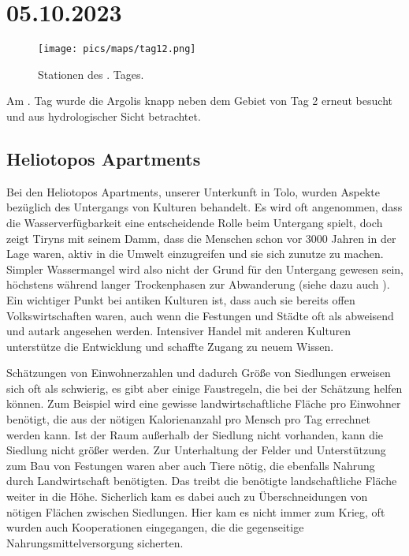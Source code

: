 \documentclass[preprint]{geomorphica} %
\begin{document}

\section{05.10.2023}

\begin{figure}[!h]
    \centering
    \texttt{[image: pics/maps/tag12.png]}
    \caption{Stationen des \theday. Tages.}
    \label{pic:tag12}
\end{figure}

Am \theday. Tag wurde die Argolis knapp neben dem Gebiet von Tag 2 erneut besucht und aus hydrologischer Sicht betrachtet.

\subsection{Heliotopos Apartments}

Bei den Heliotopos Apartments, unserer Unterkunft in Tolo, wurden Aspekte bezüglich des Untergangs von Kulturen behandelt. Es wird oft angenommen, dass die Wasserverfügbarkeit eine entscheidende Rolle beim Untergang spielt, doch zeigt Tiryns mit seinem Damm, dass die Menschen schon vor 3000 Jahren in der Lage waren, aktiv in die Umwelt einzugreifen und sie sich zunutze zu machen. Simpler Wassermangel wird also nicht der Grund für den Untergang gewesen sein, höchstens während langer Trockenphasen zur Abwanderung (siehe dazu auch \cite{unkelHydraHermesHerkules2020}). Ein wichtiger Punkt bei antiken Kulturen ist, dass auch sie bereits offen Volkswirtschaften waren, auch wenn die Festungen und Städte oft als abweisend und autark angesehen werden. Intensiver Handel mit anderen Kulturen unterstütze die Entwicklung und schaffte Zugang zu neuem Wissen.

Schätzungen von Einwohnerzahlen und dadurch Größe von Siedlungen erweisen sich oft als schwierig, es gibt aber einige Faustregeln, die bei der Schätzung helfen können. Zum Beispiel wird eine gewisse landwirtschaftliche Fläche pro Einwohner benötigt, die aus der nötigen Kalorienanzahl pro Mensch pro Tag errechnet werden kann. Ist der Raum außerhalb der Siedlung nicht vorhanden, kann die Siedlung nicht größer werden. Zur Unterhaltung der Felder und Unterstützung zum Bau von Festungen waren aber auch Tiere nötig, die ebenfalls Nahrung durch Landwirtschaft benötigten. Das treibt die benötigte landschaftliche Fläche weiter in die Höhe. Sicherlich kam es dabei auch zu Überschneidungen von nötigen Flächen zwischen Siedlungen. Hier kam es nicht immer zum Krieg, oft wurden auch Kooperationen eingegangen, die die gegenseitige Nahrungsmittelversorgung sicherten. 
\end{document}
